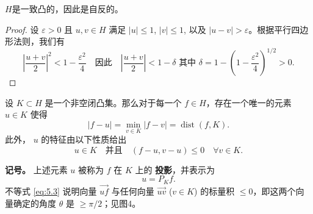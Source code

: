 \begin{proposition}\label{prop:5.1}
$H$是一致凸的，因此是自反的。
\end{proposition}

\begin{proof}
设 $\varepsilon > 0$ 且 $u, v \in H$ 满足 $|u| \le 1$, $|v| \le 1$, 以及 $|u-v| > \varepsilon$。根据平行四边形法则，我们有
\[
\left|\frac{u+v}{2}\right|^2 < 1 - \frac{\varepsilon^2}{4} \quad \text{因此} \quad \left|\frac{u+v}{2}\right| < 1 - \delta \text{ 其中 } \delta = 1 - \left(1 - \frac{\varepsilon^2}{4}\right)^{1/2} > 0.
\]
\end{proof}

\begin{theorem}[到闭凸集上的投影]\label{thm:5.2}
设 $K \subset H$ 是一个非空闭凸集。那么对于每一个 $f \in H$，存在一个唯一的元素 $u \in K$ 使得
\begin{equation}\label{eq:5.2}
|f-u| = \min_{v \in K} |f-v| = \operatorname{dist}(f, K).
\end{equation}
此外， $u$ 的特征由以下性质给出
\begin{equation}\label{eq:5.3}
u \in K \quad \text{并且} \quad (f-u, v-u) \le 0 \quad \forall v \in K.
\end{equation}
\end{theorem}

\textbf{记号。} 上述元素 $u$ 被称为 $f$ 在 $K$ 上的 \textbf{投影}，并表示为
\[
\boxed{u=P_K f}.
\]
不等式 \eqref{eq:5.3} 说明向量 $\vec{uf}$ 与任何向量 $\vec{uv}$ ($v \in K$) 的标量积 $\le 0$，即这两个向量确定的角度 $\theta$ 是 $\ge \pi/2$；见图4。

